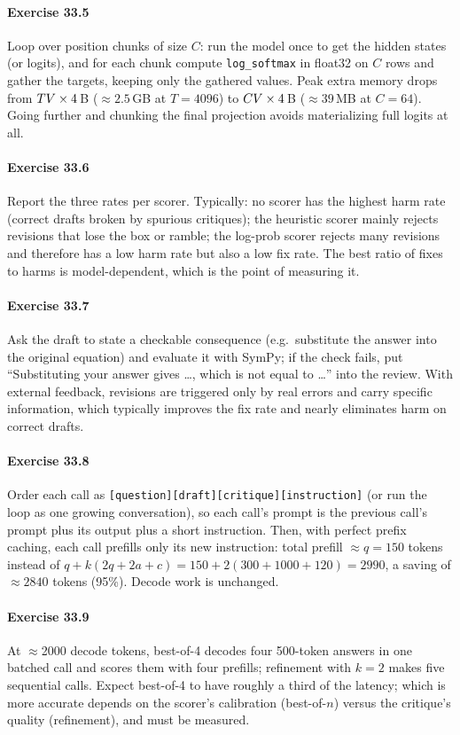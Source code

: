 \paragraph{Exercise 33.5} Loop over position chunks of size $C$: run the model once to get the hidden
states (or logits), and for each chunk compute \texttt{log\_softmax} in float32 on $C$ rows and gather
the targets, keeping only the gathered values. Peak extra memory drops from $TV \times 4$\,B
($\approx 2.5$\,GB at $T = 4096$) to $CV\times 4$\,B ($\approx 39$\,MB at $C = 64$). Going
further and chunking the final projection avoids materializing full logits at all.

\paragraph{Exercise 33.6} Report the three rates per scorer. Typically: no scorer has the highest
harm rate (correct drafts broken by spurious critiques); the heuristic scorer mainly rejects
revisions that lose the box or ramble; the log-prob scorer rejects many revisions and therefore has
a low harm rate but also a low fix rate. The best ratio of fixes to harms is model-dependent, which
is the point of measuring it.

\paragraph{Exercise 33.7} Ask the draft to state a checkable consequence (e.g.\ substitute the answer
into the original equation) and evaluate it with SymPy; if the check fails, put ``Substituting your
answer gives \dots, which is not equal to \dots'' into the review. With external feedback, revisions
are triggered only by real errors and carry specific information, which typically improves the fix
rate and nearly eliminates harm on correct drafts.

\paragraph{Exercise 33.8} Order each call as \texttt{[question][draft][critique][instruction]}
(or run the loop as one growing conversation), so each call's prompt is the previous call's prompt
plus its output plus a short instruction. Then, with perfect prefix caching, each call prefills only
its new instruction: total prefill $\approx q = 150$ tokens instead of $q + k(2q + 2a + c) = 150 +
2(300 + 1000 + 120) = 2990$, a saving of $\approx 2840$ tokens (95\%). Decode work is unchanged.

\paragraph{Exercise 33.9} At $\approx$2000 decode tokens, best-of-4 decodes four 500-token answers in
one batched call and scores them with four prefills; refinement with $k = 2$ makes five sequential
calls. Expect best-of-4 to have roughly a third of the latency; which is more accurate depends on the
scorer's calibration (best-of-$n$) versus the critique's quality (refinement), and must be measured.
